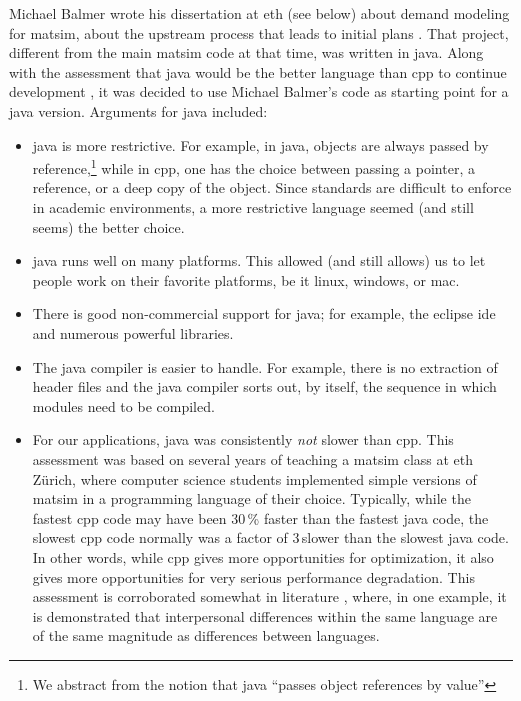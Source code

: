Michael Balmer wrote his dissertation at \gls{eth} (see below) about demand modeling for \gls{matsim}, \ie about the upstream process that leads to initial plans
\citep{Balmer_PhDThesis_2007}.  That project, different from the main \gls{matsim} code at that time, was written in \gls{java}.  Along with the assessment that \gls{java} would be the better language than \gls{cpp} to continue development%
, it was decided to use Michael Balmer's code as starting point for a \gls{java} version.  Arguments for \gls{java} included:
%
\begin{itemize}\styleItemize
\item  \gls{java} is more restrictive. For example, in \gls{java}, objects are always passed by reference,\footnote{%
%
We abstract
from the notion that \gls{java} ``passes object references by value'' %
%
} while in \gls{cpp}, one has the choice between passing a pointer, a reference, or a deep copy of the object.  Since standards are difficult to enforce in academic environments, a more restrictive language seemed (and still seems) the better choice.

\item \gls{java} runs well on many platforms.  This allowed (and still allows) us to let people work on their favorite platforms, be it \gls{linux}, \gls{windows}, or \gls{mac}.

\item There is good non-commercial support for \gls{java}; for example, the \gls{eclipse} \gls{ide} and numerous powerful libraries.

\item The \gls{java} compiler is easier to handle.  For example, there is no extraction of header files and the \gls{java} compiler sorts out, by itself, the sequence in which modules need to be compiled.

\item For our applications, \gls{java} was consistently \emph{not} slower than \gls{cpp}.  This assessment was based on several years of teaching a \gls{matsim} class at \gls{eth} Zürich, where computer science students implemented simple versions of \gls{matsim} in a programming language of their choice.  Typically, while the fastest \gls{cpp} code may have been 30\,\% faster than the fastest \gls{java} code, the slowest \gls{cpp} code normally was a factor of 3\,slower than the slowest \gls{java} code.  In other words, while \gls{cpp} gives more opportunities for optimization, it also gives more opportunities for very serious performance degradation.  This assessment is corroborated somewhat in literature \citep{Prechelt1999EfficiencyJavaVsCpp}, where, in one example, it is demonstrated that interpersonal differences within the same language are of the same magnitude as  differences between languages.


\end{itemize}
